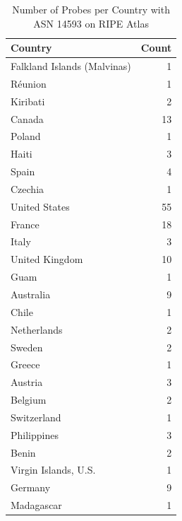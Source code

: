 \begin{table}
	\caption{Number of Probes per Country with ASN 14593 on RIPE Atlas}
	\label{fig:probes-per-country}
	\begin{tabular}{lr}
		\toprule
		Country                     & Count \\
		\midrule
		Falkland Islands (Malvinas) & 1     \\
		Réunion                     & 1     \\
		Kiribati                    & 2     \\
		Canada                      & 13    \\
		Poland                      & 1     \\
		Haiti                       & 3     \\
		Spain                       & 4     \\
		Czechia                     & 1     \\
		United States               & 55    \\
		France                      & 18    \\
		Italy                       & 3     \\
		United Kingdom              & 10    \\
		Guam                        & 1     \\
		Australia                   & 9     \\
		Chile                       & 1     \\
		Netherlands                 & 2     \\
		Sweden                      & 2     \\
		Greece                      & 1     \\
		Austria                     & 3     \\
		Belgium                     & 2     \\
		Switzerland                 & 1     \\
		Philippines                 & 3     \\
		Benin                       & 2     \\
		Virgin Islands, U.S.        & 1     \\
		Germany                     & 9     \\
		Madagascar                  & 1     \\
		\bottomrule
	\end{tabular}
\end{table}

